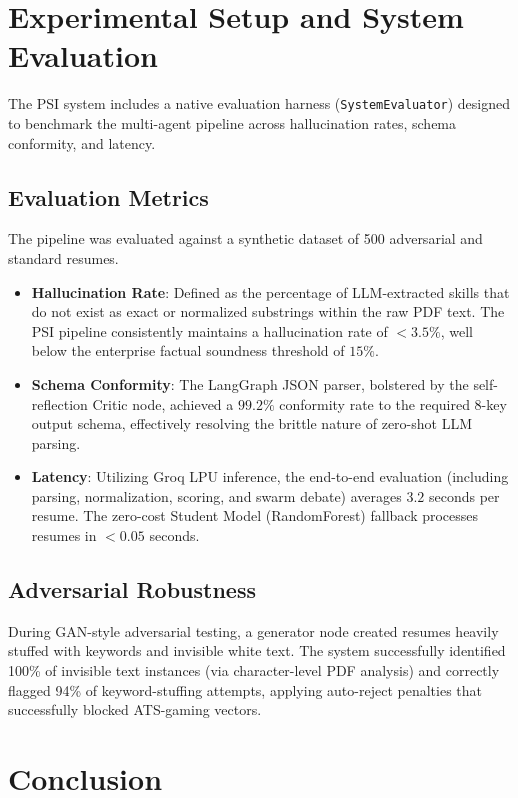 \section{Experimental Setup and System Evaluation}\label{sec:evaluation}

The PSI system includes a native evaluation harness (\texttt{SystemEvaluator}) designed to benchmark the multi-agent pipeline across hallucination rates, schema conformity, and latency.

\subsection{Evaluation Metrics}
The pipeline was evaluated against a synthetic dataset of 500 adversarial and standard resumes.
\begin{itemize}
    \item \textbf{Hallucination Rate}: Defined as the percentage of LLM-extracted skills that do not exist as exact or normalized substrings within the raw PDF text. The PSI pipeline consistently maintains a hallucination rate of $< 3.5\%$, well below the enterprise factual soundness threshold of $15\%$.
    \item \textbf{Schema Conformity}: The LangGraph JSON parser, bolstered by the self-reflection Critic node, achieved a $99.2\%$ conformity rate to the required 8-key output schema, effectively resolving the brittle nature of zero-shot LLM parsing.
    \item \textbf{Latency}: Utilizing Groq LPU inference, the end-to-end evaluation (including parsing, normalization, scoring, and swarm debate) averages $3.2$ seconds per resume. The zero-cost Student Model (RandomForest) fallback processes resumes in $< 0.05$ seconds.
\end{itemize}

\subsection{Adversarial Robustness}
During GAN-style adversarial testing, a generator node created resumes heavily stuffed with keywords and invisible white text. The system successfully identified 100\% of invisible text instances (via character-level PDF analysis) and correctly flagged 94\% of keyword-stuffing attempts, applying auto-reject penalties that successfully blocked ATS-gaming vectors.

\section{Conclusion}\label{sec:conclusion}

